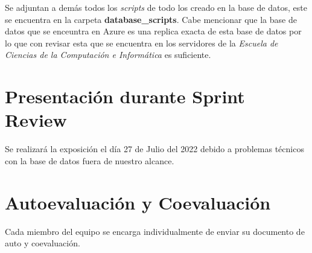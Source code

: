 \documentclass{article}
\begin{document}
Se adjuntan a demás todos los \textit{scripts} de todo los creado en la base de datos,
este se encuentra en la carpeta \textbf{database\_scripts}. Cabe mencionar que la base de datos
que se enceuntra en Azure es una replica exacta de esta base de datos por lo que con revisar
esta que se encuentra en los servidores de la \textit{Escuela de Ciencias de la Computación e Informática}
es suficiente.

\section{Presentación durante Sprint Review}
Se realizará la exposición el día 27 de Julio del 2022 debido a problemas técnicos con la 
base de datos fuera de nuestro alcance.

\section{Autoevaluación y Coevaluación}
Cada miembro del equipo se encarga individualmente de enviar su documento de auto y coevaluación.


\newpage


\end{document}
